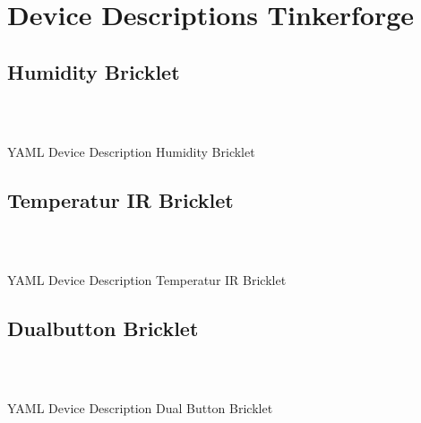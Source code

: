 \chapter{Device Descriptions Tinkerforge}
\label{app:device_descriptions}

\section{Humidity Bricklet}

\begin{listing}[H]
\begin{verbatim}



\end{verbatim}
\caption{YAML Device Description Humidity Bricklet}
\end{listing}

\section{Temperatur IR Bricklet}

\begin{listing}[H]
\begin{verbatim}



\end{verbatim}
\caption{YAML Device Description Temperatur IR Bricklet}
\end{listing}


\section{Dualbutton Bricklet}

\begin{listing}[H]
\begin{verbatim}



\end{verbatim}
\caption{YAML Device Description Dual Button Bricklet}
\end{listing}